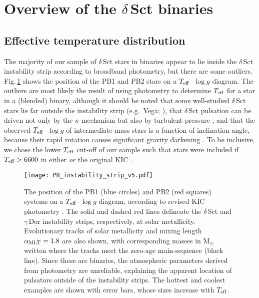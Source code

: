 \documentclass[a4paper,fleqn,usenatbib]{mnras}
\begin{document}


\section{Overview of the $\delta$\,Sct binaries}
\label{sec:overview}


\subsection{Effective temperature distribution}
\label{ssec:temp_range}

The majority of our sample of $\delta$\,Sct stars in binaries appear to lie inside the $\delta$\,Sct instability strip according to broadband photometry, but there are some outliers. Fig.\,\ref{fig:IS} shows the position of the PB1 and PB2 stars on a $T_{\rm eff}$--$\log g$ diagram. The outliers are most likely the result of using photometry to determine $T_{\rm eff}$ for a star in a (blended) binary, although it should be noted that some well-studied $\delta$\,Sct stars lie far outside the instability strip (e.g.\ Vega; \citealt{butkovskaya2014}), that $\delta$\,Sct pulsation can be driven not only by the $\kappa$-mechanism but also by turbulent pressure \citep{antocietal2014}, and that the observed $T_{\rm eff}$--$\log g$ of intermediate-mass stars is a function of inclination angle, because their rapid rotation causes significant gravity darkening \citep{frematetal2005}. To be inclusive, we chose the lower $T_{\rm eff}$ cut-off of our sample such that stars were included if $T_{\rm eff} > 6600$ in either \citet{huberetal2014} {\em or} the original KIC \citep{brownetal2011}.


\begin{figure}
\begin{center}
\texttt{[image: PB\_instability\_strip\_v5.pdf]}
\caption{The position of the PB1 (blue circles) and PB2 (red squares) systems on a $T_{\rm eff}$--$\log g$ diagram, according to revised KIC photometry \citep{huberetal2014}. The solid and dashed red lines delineate the $\delta$\,Sct and $\gamma$\,Dor instability strips, respectively, at solar metallicity. Evolutionary tracks of solar metallicity and mixing length $\alpha_{\rm MLT} = 1.8$ \citep{grigahceneetal2005} are also shown, with corresponding masses in M$_{\odot}$ written where the tracks meet the zero-age main-sequence (black line). Since these are binaries, the atmospheric parameters derived from photometry are unreliable, explaining the apparent location of pulsators outside of the instability strips. The hottest and coolest examples are shown with error bars, whose sizes increase with $T_{\rm eff}$.}
\label{fig:IS}
\end{center}
\end{figure}
\end{document}
